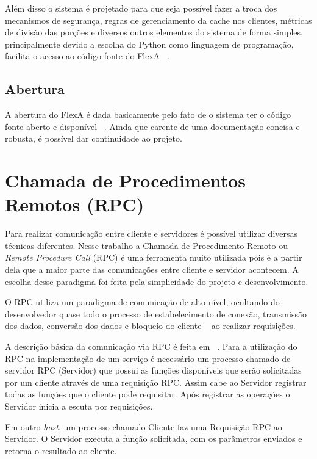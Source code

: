         Além disso o sistema é projetado para que seja possível fazer a troca dos mecanismos de segurança, regras de gerenciamento da cache nos clientes,  métricas de divisão das porções e diversos outros elementos do sistema de forma simples, principalmente devido a escolha do Python como linguagem de programação, facilita o acesso ao código fonte do FlexA ~\cite{silas}.
        
    \subsection{Abertura}
    
    A abertura do FlexA é dada basicamente pelo fato de o sistema ter o código fonte aberto e disponível ~\cite{silas}. Ainda que carente de uma documentação concisa e robusta, é possível dar continuidade ao projeto.


\section{Chamada de Procedimentos Remotos (RPC)}

    Para realizar comunicação entre cliente e servidores é possível utilizar diversas técnicas diferentes. Nesse trabalho a Chamada de Procedimento Remoto ou \textit{Remote Procedure Call} (RPC) é uma ferramenta muito utilizada pois é a partir dela que a maior parte das comunicações entre cliente e servidor acontecem. A escolha desse paradigma foi feita pela simplicidade do projeto e desenvolvimento. 
    
    O RPC utiliza um paradigma de comunicação de alto nível, ocultando do desenvolvedor quase todo o processo de estabelecimento de conexão, transmissão dos dados, conversão dos dados e bloqueio do cliente ~\cite{rpc} ao realizar requisições.
    
    A descrição básica da comunicação via RPC é feita em ~\cite{rpc}. Para a utilização do RPC na implementação de um serviço é necessário um processo chamado de servidor RPC (Servidor) que possui as funções disponíveis que serão solicitadas por um cliente através de uma requisição RPC. Assim cabe ao Servidor registrar todas as funções que o cliente pode requisitar. Após registrar as operações o Servidor inicia a escuta por requisições.
    
    Em outro \textit{host}, um processo chamado Cliente faz uma Requisição RPC ao Servidor. O Servidor executa a função solicitada, com os parâmetros enviados e retorna o resultado ao cliente.
    
